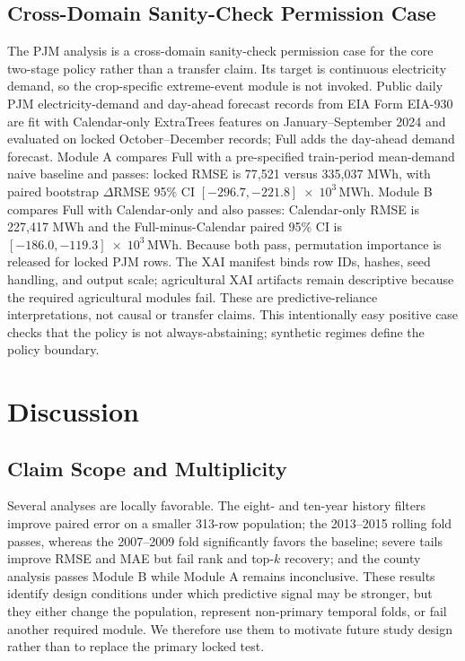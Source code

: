 \documentclass[conference]{IEEEtran}
\begin{document}
\subsection{Cross-Domain Sanity-Check Permission Case}
The PJM analysis is a cross-domain sanity-check permission case for the core
two-stage policy rather than a transfer claim. Its target is continuous electricity
demand, so the crop-specific extreme-event module is not invoked. Public daily PJM
electricity-demand and day-ahead forecast records from EIA Form EIA-930
\cite{EIA930} are fit with Calendar-only ExtraTrees features on
January--September 2024 and evaluated on locked October--December records; Full
adds the day-ahead demand forecast. Module A compares Full with a pre-specified
train-period mean-demand naive baseline and passes: locked RMSE is 77,521 versus
335,037 MWh, with paired bootstrap $\Delta$RMSE 95\% CI
$[-296.7, -221.8]\;\times\;10^3\,\mathrm{MWh}$. Module B compares Full with Calendar-only and
also passes: Calendar-only RMSE is 227,417 MWh and the Full-minus-Calendar paired
95\% CI is $[-186.0, -119.3]\;\times\;10^3\,\mathrm{MWh}$. Because both pass, permutation
importance is released for locked PJM rows. The XAI manifest binds row IDs,
hashes, seed handling, and output scale; agricultural XAI artifacts remain
descriptive because the required agricultural modules fail. These are predictive-reliance
interpretations, not causal or transfer claims. This intentionally easy positive
case checks that the policy is not always-abstaining; synthetic regimes define the
policy boundary.

\section{Discussion}
\subsection{Claim Scope and Multiplicity}
Several analyses are locally favorable. The eight- and ten-year history filters
improve paired error on a smaller 313-row population; the 2013--2015 rolling fold
passes, whereas the 2007--2009 fold significantly favors the baseline; severe
tails improve RMSE and MAE but fail rank and top-$k$ recovery; and the county
analysis passes Module B while Module A remains inconclusive. These results
identify design conditions under which predictive signal may be stronger, but
they either change the population, represent non-primary temporal folds, or fail
another required module. We therefore use them to motivate future study design
rather than to replace the primary locked test.
\end{document}
